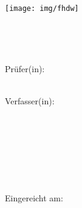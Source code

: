 
\begin{titlepage}

\begin{center}
\texttt{[image: img/fhdw]}

\vspace{7mm}

\Huge{\bfseries\dokumententyp}\\

\vspace{5mm}

\LARGE{\dokumententitel}\\

\vspace{15mm}

\large{Prüfer(in):\\

\dokumentenpruefer\\

\vspace{15mm}

Verfasser(in):\\

\dokumentenautor\\

\martikelnummer\\

\vspace{3mm}

\dokumentenautoradress\\

\vspace{7mm}

\studiengang\\

\spezialisierungsbereich\\

}

\enlargethispage{2em}

\vspace{15mm}

\large{Eingereicht am:\\

\abgabedatum \\

}

\end{center}


\end{titlepage}

\restoregeometry
